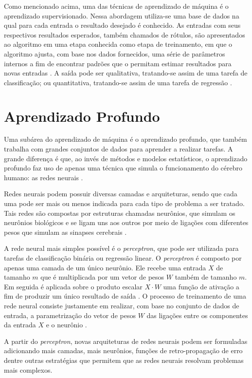 Como mencionado acima, uma das técnicas de aprendizado de máquina é o aprendizado supervisionado. Nessa abordagem utiliza-se uma base de dados na qual para cada entrada o resultado desejado é conhecido. As entradas com seus respectivos resultados esperados, também chamados de rótulos, são apresentados ao algoritmo em uma etapa conhecida como etapa de treinamento, em que o algoritmo ajusta, com base nos dados fornecidos, uma série de parâmetros internos a fim de encontrar padrões que o permitam estimar resultados para novas entradas \cite{monard2003conceitos}. A saída pode ser qualitativa, tratando-se assim de uma tarefa de classificação; ou quantitativa, tratando-se assim de uma tarefa de regressão \cite{mueller2019deep}.

\section{Aprendizado Profundo}

Uma subárea do aprendizado de máquina é o aprendizado profundo, que também trabalha com grandes conjuntos de dados para aprender a realizar tarefas. A grande diferença é que, ao invés de métodos e modelos estatísticos, o aprendizado profundo faz uso de apenas uma técnica que simula o funcionamento do cérebro humano: as redes neurais \cite{mueller2019deep}. 

Redes neurais podem possuir diversas camadas e arquiteturas, sendo que cada uma pode ser mais ou menos indicada para cada tipo de problema a ser tratado.
Tais redes são compostas por estruturas chamadas neurônios, que simulam os neurônios biológicos e se ligam uns aos outros por meio de ligações com diferentes pesos que simulam as sinapses cerebrais \cite{mueller2019deep}.

A rede neural mais simples possível é o \textit{perceptron}, que pode ser utilizada para tarefas de classificação binária ou regressão linear. O \textit{perceptron} é composto por apenas uma camada de um único neurônio. Ele recebe uma entrada $X$ de tamanho $m$ que é multiplicada por um vetor de pesos $W$ também de tamanho $m$. Em seguida é aplicada sobre o produto escalar $X \cdot W$ uma função de ativação a fim de produzir um único resultado de saída \cite{block1962perceptron}. O processo de treinamento de uma rede neural consiste justamente em realizar, com base no conjunto de dados de entrada, a parametrização do vetor de pesos $W$ das ligações entre os componentes da entrada $X$ e o neurônio \cite{mueller2019deep}.

A partir do \textit{perceptron}, novas arquiteturas de redes neurais podem ser formuladas adicionando mais camadas, mais neurônios, funções de retro-propagação de erro dentre outras estratégias que permitem que as redes neurais resolvam problemas mais complexos.

